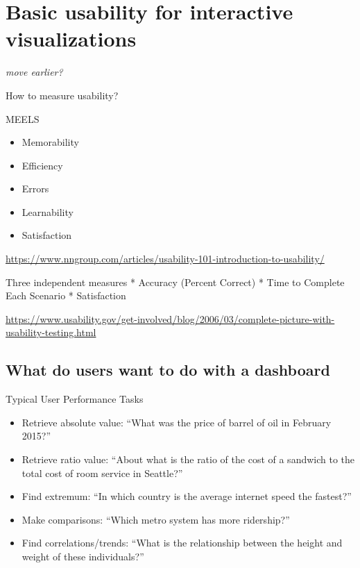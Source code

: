 \documentclass[
]{krantz}
\providecommand{\tightlist}{%
  \setlength{\itemsep}{0pt}\setlength{\parskip}{0pt}}
\begin{document}
\hypertarget{usability-for-visualizations}{%
\chapter{Basic usability for interactive visualizations}\label{usability-for-visualizations}}

\emph{move earlier?}

How to measure usability?

MEELS

\begin{itemize}
\tightlist
\item
  Memorability
\item
  Efficiency
\item
  Errors
\item
  Learnability
\item
  Satisfaction
\end{itemize}

\url{https://www.nngroup.com/articles/usability-101-introduction-to-usability/}

Three independent measures
* Accuracy (Percent Correct)
* Time to Complete Each Scenario
* Satisfaction

\url{https://www.usability.gov/get-involved/blog/2006/03/complete-picture-with-usability-testing.html}

\hypertarget{what-do-users-want-to-do-with-a-dashboard}{%
\section{What do users want to do with a dashboard}\label{what-do-users-want-to-do-with-a-dashboard}}

Typical User Performance Tasks

\begin{itemize}
\item
  Retrieve absolute value: ``What was the price of barrel of oil in February 2015?''
\item
  Retrieve ratio value: ``About what is the ratio of the cost of a sandwich to the
  total cost of room service in Seattle?''
\item
  Find extremum: ``In which country is the average internet speed the fastest?''
\item
  Make comparisons: ``Which metro system has more ridership?''
\item
  Find correlations/trends: ``What is the relationship between the height
  and weight of these individuals?''
\end{itemize}
\end{document}
